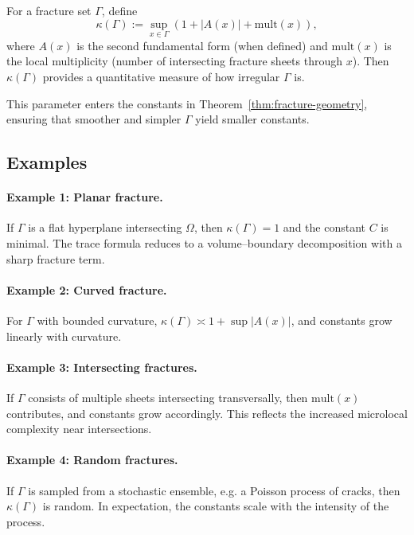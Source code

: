 \begin{definition}
For a fracture set $\Gamma$, define
\[
\kappa(\Gamma) := \sup_{x \in \Gamma} (1+|A(x)| + \mathrm{mult}(x)),
\]
where $A(x)$ is the second fundamental form (when defined) and
$\mathrm{mult}(x)$ is the local multiplicity (number of intersecting
fracture sheets through $x$).  
Then $\kappa(\Gamma)$ provides a quantitative measure of how irregular
$\Gamma$ is.
\end{definition}

This parameter enters the constants in Theorem~\ref{thm:fracture-geometry},
ensuring that smoother and simpler $\Gamma$ yield smaller constants.

\subsection{Examples}

\paragraph{Example 1: Planar fracture.}
If $\Gamma$ is a flat hyperplane intersecting $\Omega$, then
$\kappa(\Gamma)=1$ and the constant $C$ is minimal.
The trace formula reduces to a volume–boundary decomposition with a
sharp fracture term.

\paragraph{Example 2: Curved fracture.}
For $\Gamma$ with bounded curvature, $\kappa(\Gamma)\asymp 1+\sup|A(x)|$,
and constants grow linearly with curvature.

\paragraph{Example 3: Intersecting fractures.}
If $\Gamma$ consists of multiple sheets intersecting transversally,
then $\mathrm{mult}(x)$ contributes, and constants grow accordingly.
This reflects the increased microlocal complexity near intersections.

\paragraph{Example 4: Random fractures.}
If $\Gamma$ is sampled from a stochastic ensemble, e.g. a Poisson
process of cracks, then $\kappa(\Gamma)$ is random.  
In expectation, the constants scale with the intensity of the process.

